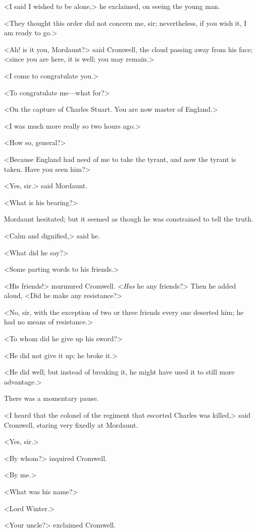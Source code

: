 <I said I wished to be alone,> he exclaimed, on seeing the young man.

<They thought this order did not concern me, sir; nevertheless, if you wish it, I am ready to go.>

<Ah! is it you, Mordaunt?> said Cromwell, the cloud passing away from his face; <since you are here, it is well; you may remain.>

<I come to congratulate you.>

<To congratulate me—what for?>

<On the capture of Charles Stuart. You are now master of England.>

<I was much more really so two hours ago.>

<How so, general?>

<Because England had need of me to take the tyrant, and now the tyrant is taken. Have you seen him?>

<Yes, sir.> said Mordaunt.

<What is his bearing?>

Mordaunt hesitated; but it seemed as though he was constrained to tell the truth.

<Calm and dignified,> said he.

<What did he say?>

<Some parting words to his friends.>

<His friends!> murmured Cromwell. <\emph{Has} he any friends?> Then he added aloud, <Did he make any resistance?>

<No, sir, with the exception of two or three friends every one deserted him; he had no means of resistance.>

<To whom did he give up his sword?>

<He did not give it up; he broke it.>

<He did well; but instead of breaking it, he might have used it to still more advantage.>

There was a momentary pause.

<I heard that the colonel of the regiment that escorted Charles was killed,> said Cromwell, staring very fixedly at Mordaunt.

<Yes, sir.>

<By whom?> inquired Cromwell.

<By me.>

<What was his name?>

<Lord Winter.>

<Your uncle?> exclaimed Cromwell.

